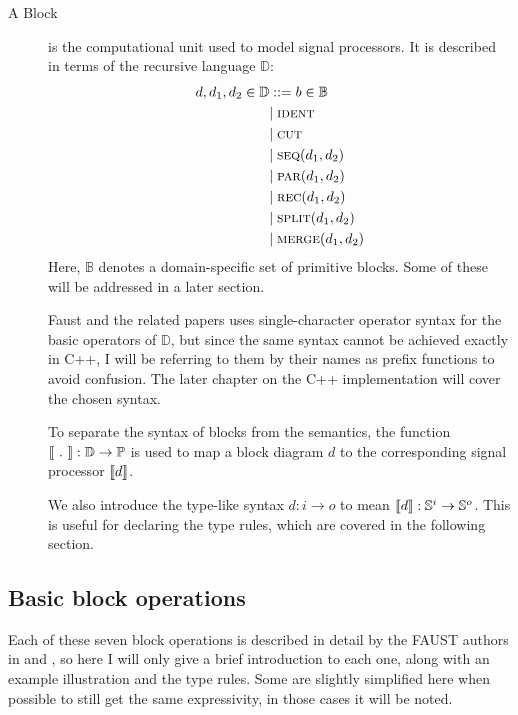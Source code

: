 \begin{description}
  \item[A Block] is the computational unit used to model signal processors. It is described in terms of the
        recursive language $\mathbb D$:
        \begin{align*}
          d, d_1, d_2 \in \mathbb{D} & ::= b \in \mathbb{B}      \\
                                     & |\; \textsc{ident}                \\
                                     & |\; \textsc{cut}                  \\
                                     & |\; \textsc{seq}(d_1, d_2) \\
                                     & |\; \textsc{par}(d_1, d_2)   \\
                                     & |\; \textsc{rec}(d_1, d_2)  \\
                                     & |\; \textsc{split}(d_1, d_2)      \\
                                     & |\; \textsc{merge}(d_1, d_2)      \\
        \end{align*}
        Here, $\mathbb B$ denotes a domain-specific set of primitive blocks. Some of these will be
        addressed in a later section.

        Faust and the related papers\autocite{orlarey2002,orlarey2004} uses single-character operator syntax for the basic
        operators of $\mathbb D$, but since the same syntax cannot be achieved exactly in C++, I will be
        referring to them by their names as prefix functions to avoid confusion. The later chapter on the C++
        implementation will cover the chosen syntax.

        To separate the syntax of blocks from the semantics, the function $\llbracket \ .\  \rrbracket : \mathbb D
          \rightarrow \mathbb P$ is used to map a
        block diagram $d$ to the corresponding signal processor $\llbracket d \rrbracket$.

        We also introduce the type-like syntax $d : i \rightarrow o$ to mean $\llbracket d \rrbracket : \mathbb{S}^i \rightarrow \mathbb{S}^o$. This is useful
        for declaring the type rules, which are covered in the following section.
\end{description}

\subsection{Basic block operations}
Each of these seven block operations is described in detail by the FAUST authors in \autocite{orlarey2002}
and \autocite{orlarey2004}, so here I will only give a brief introduction to each one, along with an example
illustration and the type rules. Some are slightly simplified here when possible to still get the same
expressivity, in those cases it will be noted.

